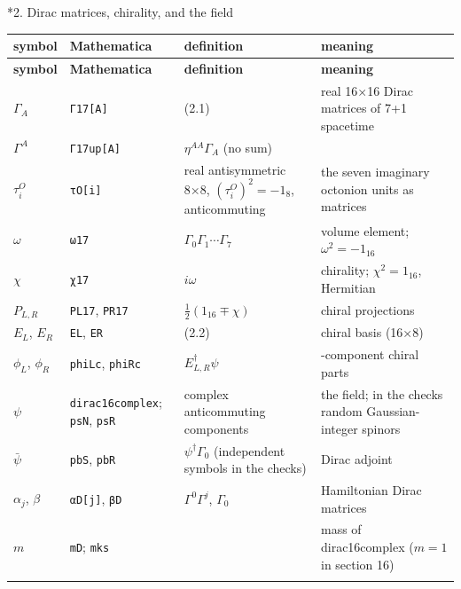 \documentclass[10pt,a4paper]{article}
\makeatletter
\renewcommand\section{\@startsection{section}{1}{\z@}{-3.5ex \@plus -1ex \@minus -.2ex}{2.3ex \@plus.2ex}{\normalfont\Large\bfseries\raggedright}}
\makeatother
\begin{document}
\section*{2. Dirac matrices, chirality, and the field}
{\small
\begin{longtable}{>{\raggedright\arraybackslash}p{}>{\raggedright\arraybackslash}p{}>{\raggedright\arraybackslash}p{}>{\raggedright\arraybackslash}p{}}
\toprule
\textbf{symbol} & \textbf{Mathematica} & \textbf{definition} & \textbf{meaning} \\
\midrule\endfirsthead
\toprule
\textbf{symbol} & \textbf{Mathematica} & \textbf{definition} & \textbf{meaning} \\
\midrule\endhead
\endfoot
\bottomrule\endlastfoot
$\Gamma_A$ & \texttt{Γ17[A]} & (2.1) & real 16×16 Dirac matrices of 7+1 spacetime \\
$\Gamma^A$ & \texttt{Γ17up[A]} & $\eta^{AA}\Gamma_A$ (no sum) &  \\
$\tau^O_i$ & \texttt{τO[i]} & real antisymmetric 8×8, $(\tau^O_i)^2=-1_8$, anticommuting & the seven imaginary octonion units as matrices \\
$\omega$ & \texttt{ω17} & $\Gamma_0\Gamma_1\cdots\Gamma_7$ & volume element; $\omega^2=-1_{16}$ \\
$\chi$ & \texttt{χ17} & $i\omega$ & chirality; $\chi^2=1_{16}$, Hermitian \\
$P_{L,R}$ & \texttt{PL17}, \texttt{PR17} & $\tfrac12(1_{16}\mp\chi)$ & chiral projections \\
$E_L$, $E_R$ & \texttt{EL}, \texttt{ER} & (2.2) & chiral basis (16×8) \\
$\phi_L$, $\phi_R$ & \texttt{phiLc}, \texttt{phiRc} & $E_{L,R}^\dagger\psi$ & 8-component chiral parts \\
$\psi$ & \texttt{dirac16complex}; \texttt{psN}, \texttt{psR} & 16 complex anticommuting components & the field; in the checks random Gaussian-integer spinors \\
$\bar\psi$ & \texttt{pbS}, \texttt{pbR} & $\psi^\dagger\Gamma_0$ (independent symbols in the checks) & Dirac adjoint \\
$\alpha_j$, $\beta$ & \texttt{αD[j]}, \texttt{βD} & $\Gamma^0\Gamma^j$, $\Gamma_0$ & Hamiltonian Dirac matrices \\
$m$ & \texttt{mD}; \texttt{mks} &  & mass of dirac16complex ($m=1$ in section 16) \\*
\end{longtable}}
\end{document}
